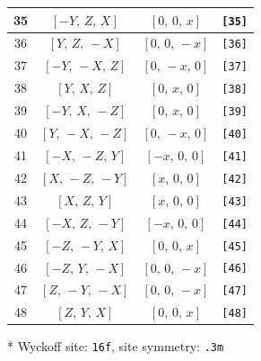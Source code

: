 \documentclass[fleqn,8pt]{jsarticle}
\begin{document}
\begin{longtable}{cccc}
35 & $\left[ - Y,\, Z,\, X \right]$ & $\left[ 0,\, 0,\, x \right]$ & {\tt [35]} \\ \hline
36 & $\left[ Y,\, Z,\, - X \right]$ & $\left[ 0,\, 0,\, - x \right]$ & {\tt [36]} \\ \hline
37 & $\left[ - Y,\, - X,\, Z \right]$ & $\left[ 0,\, - x,\, 0 \right]$ & {\tt [37]} \\ \hline
38 & $\left[ Y,\, X,\, Z \right]$ & $\left[ 0,\, x,\, 0 \right]$ & {\tt [38]} \\ \hline
39 & $\left[ - Y,\, X,\, - Z \right]$ & $\left[ 0,\, x,\, 0 \right]$ & {\tt [39]} \\ \hline
40 & $\left[ Y,\, - X,\, - Z \right]$ & $\left[ 0,\, - x,\, 0 \right]$ & {\tt [40]} \\ \hline
41 & $\left[ - X,\, - Z,\, Y \right]$ & $\left[ - x,\, 0,\, 0 \right]$ & {\tt [41]} \\ \hline
42 & $\left[ X,\, - Z,\, - Y \right]$ & $\left[ x,\, 0,\, 0 \right]$ & {\tt [42]} \\ \hline
43 & $\left[ X,\, Z,\, Y \right]$ & $\left[ x,\, 0,\, 0 \right]$ & {\tt [43]} \\ \hline
44 & $\left[ - X,\, Z,\, - Y \right]$ & $\left[ - x,\, 0,\, 0 \right]$ & {\tt [44]} \\ \hline
45 & $\left[ - Z,\, - Y,\, X \right]$ & $\left[ 0,\, 0,\, x \right]$ & {\tt [45]} \\ \hline
46 & $\left[ - Z,\, Y,\, - X \right]$ & $\left[ 0,\, 0,\, - x \right]$ & {\tt [46]} \\ \hline
47 & $\left[ Z,\, - Y,\, - X \right]$ & $\left[ 0,\, 0,\, - x \right]$ & {\tt [47]} \\ \hline
48 & $\left[ Z,\, Y,\, X \right]$ & $\left[ 0,\, 0,\, x \right]$ & {\tt [48]} \\
\end{longtable}
* Wyckoff site: {\tt 16f}, site symmetry: {\tt .3m}
\renewcommand{\arraystretch}{1.2}
\end{document}
